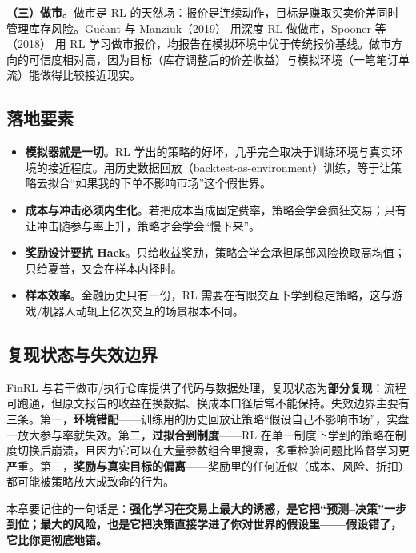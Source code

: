 \textbf{（三）做市}。做市是 RL 的天然场：报价是连续动作，目标是赚取买卖价差同时管理库存风险。Gu\'eant 与 Manziuk（2019）\cite{guant2019} 用深度 RL 做做市，Spooner 等（2018）\cite{spooner2018} 用 RL 学习做市报价，均报告在模拟环境中优于传统报价基线。做市方向的可信度相对高，因为目标（库存调整后的价差收益）与模拟环境（一笔笔订单流）能做得比较接近现实。

\subsection{落地要素}

\begin{itemize}
  \item \textbf{模拟器就是一切}。RL 学出的策略的好坏，几乎完全取决于训练环境与真实环境的接近程度。用历史数据回放（backtest-as-environment）训练，等于让策略去拟合“如果我的下单不影响市场”这个假世界。
  \item \textbf{成本与冲击必须内生化}。若把成本当成固定费率，策略会学会疯狂交易；只有让冲击随参与率上升，策略才会学会“慢下来”。
  \item \textbf{奖励设计要抗 Hack}。只给收益奖励，策略会学会承担尾部风险换取高均值；只给夏普，又会在样本内择时。
  \item \textbf{样本效率}。金融历史只有一份，RL 需要在有限交互下学到稳定策略，这与游戏/机器人动辄上亿次交互的场景根本不同。
\end{itemize}

\subsection{复现状态与失效边界}

FinRL\cite{liu2021finrl} 与若干做市/执行仓库提供了代码与数据处理，复现状态为\textbf{部分复现}：流程可跑通，但原文报告的收益在换数据、换成本口径后常不能保持。失效边界主要有三条。第一，\textbf{环境错配}——训练用的历史回放让策略“假设自己不影响市场”，实盘一放大参与率就失效。第二，\textbf{过拟合到制度}——RL 在单一制度下学到的策略在制度切换后崩溃，且因为它可以在大量参数组合里搜索，多重检验问题比监督学习更严重。第三，\textbf{奖励与真实目标的偏离}——奖励里的任何近似（成本、风险、折扣）都可能被策略放大成致命的行为。

本章要记住的一句话是：\textbf{强化学习在交易上最大的诱惑，是它把“预测--决策”一步到位；最大的风险，也是它把决策直接学进了你对世界的假设里——假设错了，它比你更彻底地错。}
